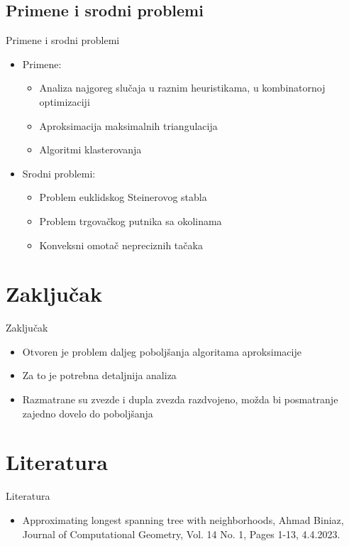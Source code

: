 \documentclass[hyperref={bookmarks=false}]{beamer}
\begin{document}
\subsection{Primene i srodni problemi}
\begin{frame}{Primene i srodni problemi}
\begin{itemize}
    \item Primene:
    \begin{itemize}
        \item Analiza najgoreg slučaja u raznim heuristikama, u kombinatornoj optimizaciji
        \item Aproksimacija maksimalnih triangulacija
        \item Algoritmi klasterovanja
    \end{itemize}
    \item Srodni problemi:
    \begin{itemize}
        \item Problem euklidskog Steinerovog stabla
        \item Problem trgovačkog putnika sa okolinama
        \item Konveksni omotač nepreciznih tačaka
    \end{itemize}
 
\end{itemize}   
\end{frame}

\section{Zaključak}
\begin{frame}{Zaključak}
\begin{itemize}
    \item Otvoren je problem daljeg poboljšanja algoritama aproksimacije
    \item Za to je potrebna detaljnija analiza
    \item Razmatrane su zvezde i dupla zvezda razdvojeno, možda bi posmatranje zajedno dovelo do poboljšanja
\end{itemize}
    
\end{frame}

\section{Literatura}
\begin{frame}{Literatura}
\begin{itemize}
    \item Approximating longest spanning tree with neighborhoods, Ahmad Biniaz, Journal of Computational Geometry, Vol. 14 No. 1, Pages 1-13, 4.4.2023. 
\end{itemize}
\end{frame}
\end{document}
